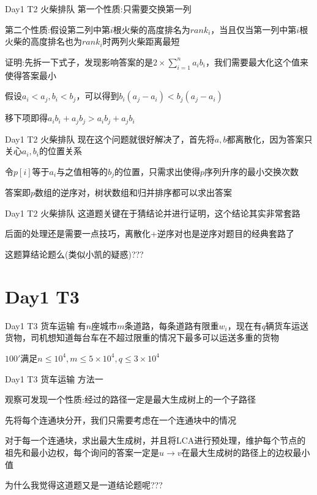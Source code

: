 \documentclass[10pt]{beamer}
\begin{document}
  \begin{frame}{Day1 T2 火柴排队}
     第一个性质:只需要交换第一列

     第二个性质:假设第二列中第$i$根火柴的高度排名为$rank_i$，当且仅当第一列中第$i$根火柴的高度排名也为$rank_i$时两列火柴距离最短

     证明:先拆一下式子，发现影响答案的是$2\times \sum_{i=1}^{n}a_ib_i$，我们需要最大化这个值来使得答案最小

     假设$a_i<a_j,b_i<b_j$，可以得到$b_i(a_j-a_i)<b_j(a_j-a_i)$
    
     移下项即得$a_ib_i+a_jb_j>a_ib_j+a_jb_i$
  \end{frame}

  \begin{frame}{Day1 T2 火柴排队}
     现在这个问题就很好解决了，首先将$a,b$都离散化，因为答案只关心$a_i,b_i$的位置关系

     令$p[i]$等于$a_i$与之值相等的$b_j$的位置，只需求出使得$p$序列升序的最小交换次数

     答案即$p$数组的逆序对，树状数组和归并排序都可以求出答案
  \end{frame}

  \begin{frame}{Day1 T2 火柴排队}
     这道题关键在于猜结论并进行证明，这个结论其实非常套路

     后面的处理还是需要一点技巧，离散化+逆序对也是逆序对题目的经典套路了

     这题算结论题么(类似小凯的疑惑)???
  \end{frame}

  \section{Day1 T3}

  \begin{frame}{Day1 T3 货车运输}
     有$n$座城市$m$条道路，每条道路有限重$w_i$，现在有$q$辆货车运送货物，司机想知道每台车在不超过限重的情况下最多可以运送多重的货物

     $100'$满足$n\leq 10^4,m\leq 5\times 10^4,q\leq 3\times 10^4$
  \end{frame}

  \begin{frame}{Day1 T3 货车运输}
     方法一

     观察可发现一个性质:经过的路径一定是最大生成树上的一个子路径

     先将每个连通块分开，我们只需要考虑在一个连通块中的情况

     对于每一个连通块，求出最大生成树，并且将LCA进行预处理，维护每个节点的祖先和最小边权，每个询问的答案一定是$u\rightarrow v$在最大生成树的路径上的边权最小值
    
     为什么我觉得这道题又是一道结论题呢???
  \end{frame}
\end{document}
